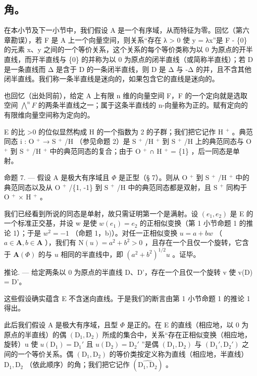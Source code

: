 \subsection{角。}

在本小节及下一小节中，我们假设 A 是一个有序域，从而特征为零。回忆（第六章勘误），若 F 是 A 上一个向量空间，则关系“存在 λ \textgreater{} 0 使 y = λx”是 F - \{0\} 的元素 x、y 之间的一个等价关系，这个关系的每个等价类称为以 0 为原点的开半直线，而开半直线与 \{0\} 的并称为以 0 为原点的闭半直线（或简称半直线）；若 D 是一条直线而 Δ 是含于 D 的一条闭半直线，则 D 是 Δ 与 -Δ 的并，且不含其他闭半直线。我们称一条半直线是迷向的，如果包含它的直线是迷向的。

也回忆（出处同前），给定 A 上有限 n 维的向量空间 F，F 的一个定向就是选取空间 \(\bigwedge^{n}F\) 的两条半直线之一；属于这条半直线的 n-向量称为正的。赋有定向的有限维向量空间称为定向的。

E 的比 \textgreater0 的位似显然构成 H 的一个指数为 2 的子群；我们把它记作 H \(^{+}\) 。典范同态 i : O \(^{+}\) → S \(^{+}\) /H （参见命题 2）是 S \(^{+}\) /H \(^{+}\) 到 S \(^{+}\) /H 上的典范同态与 O \(^{+}\) 到 S \(^{+}\) /H \(^{+}\) 中的典范同态的复合；由于 O \(^{+}\) ∩ H \(^{+}\) = \{1\} ，后一同态是单射。

命题 7. --- 假设 A 是极大有序域且 \(\Phi\) 是正型（§ 7）。则从 O \(^{+}\) 到 S \(^{+}\) /H \(^{+}\) 中的典范同态以及从 O \(^{+}\) /\{1, -1\} 到 S \(^{+}\) /H 中的典范同态都是双射，且 S \(^{+}\) 同构于 O \(^{+}\) × H \(^{+}\) 。

我们已经看到所说的同态是单射，故只需证明第一个是满射。设 \((e_{1}, e_{2})\) 是 E 的一个标准正交基，并设 w 是使 \(w(e_{1}) = e_{2}\) 的正相似变换（第 1 小节命题 1 的推论 1）；于是 \(w^{2} = -1\) （命题 1，b)）。对任一正相似变换 \(u = a + bw\) （ \(a \in \mathbf{A}, b \in \mathbf{A}\) ），我们有 \(\mathrm{N}(u) = a^2 + b^2 > 0\) ，且存在一个且仅一个旋转，它含于 \(\mathbf{A}(\Phi)\) 的与 \(u\) 相同的半直线中，即 \((a^2 + b^2)^{1/2} u\) 。证毕。

推论. --- 给定两条以 0 为原点的半直线 D、D'，存在一个且仅一个旋转 v 使 v(D) = D'。

这些假设确实蕴含 E 不含迷向直线。于是我们的断言由第 1 小节命题 1 的推论 1 得出。

此后我们假设 A 是极大有序域，且型 \(\Phi\) 是正的。在 E 的直线（相应地，以 0 为原点的半直线）的偶 \((\mathrm{D}_1, \mathrm{D}_2)\) 所成的集合中，关系“存在正相似变换（相应地，旋转）u 使 \(u(\mathrm{D}_1) = \mathrm{D}_1'\) 且 \(u(\mathrm{D}_2) = \mathrm{D}_2'\) ”是偶 \((\mathrm{D}_1, \mathrm{D}_2)\) 与 \((\mathrm{D}_1', \mathrm{D}_2')\) 之间的一个等价关系。偶 \((\mathrm{D}_1, \mathrm{D}_2)\) 的等价类按定义称为直线（相应地，半直线）\(\mathrm{D}_1, \mathrm{D}_2\) （依此顺序）的角；我们把它记作 \((\widehat{\mathrm{D}_1, \mathrm{D}_2})\) 。

